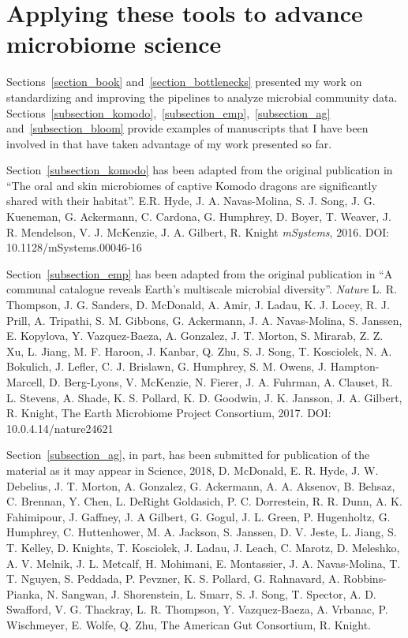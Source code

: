 \section{Applying these tools to advance microbiome science}\label{section_contributions}

Sections~\ref{section_book} and~\ref{section_bottlenecks} presented my work
on standardizing and improving the pipelines to analyze microbial community data.
Sections~\ref{subsection_komodo},~\ref{subsection_emp},~\ref{subsection_ag}
and~\ref{subsection_bloom} provide examples of manuscripts that I have been
involved in that have taken advantage of my work presented so far.

Section~\ref{subsection_komodo} has been adapted from the original publication in
``The oral and skin microbiomes of captive Komodo dragons are significantly shared
with their habitat''. E.R. Hyde, J. A. Navas-Molina, S. J. Song, J. G. Kueneman,
G. Ackermann, C. Cardona, G. Humphrey, D. Boyer, T. Weaver, J. R. Mendelson,
V. J. McKenzie, J. A. Gilbert, R. Knight \emph{mSystems}, 2016. DOI: 10.1128/mSystems.00046-16

Section~\ref{subsection_emp} has been adapted from the original publication in
``A communal catalogue reveals Earth's multiscale microbial diversity''.
\emph{Nature} L. R. Thompson, J. G. Sanders, D. McDonald, A. Amir,
J. Ladau, K. J. Locey, R. J. Prill, A. Tripathi, S. M. Gibbons, G. Ackermann,
J. A. Navas-Molina, S. Janssen, E. Kopylova, Y. Vazquez-Baeza, A. Gonzalez,
J. T. Morton, S. Mirarab, Z. Z. Xu, L. Jiang, M. F. Haroon, J. Kanbar, Q. Zhu,
S. J. Song, T. Kosciolek, N. A. Bokulich, J. Lefler, C. J. Brislawn, G. Humphrey,
S. M. Owens, J. Hampton-Marcell, D. Berg-Lyons, V. McKenzie, N. Fierer, J. A. Fuhrman,
A. Clauset, R. L. Stevens, A. Shade, K. S. Pollard, K. D. Goodwin, J. K. Jansson,
J. A. Gilbert, R. Knight, The Earth Microbiome Project Consortium, 2017. DOI: 10.0.4.14/nature24621

Section~\ref{subsection_ag}, in part, has been submitted for publication of the
material as it may appear in Science, 2018, D. McDonald, E. R. Hyde, J. W. Debelius,
J. T. Morton, A. Gonzalez, G. Ackermann, A. A. Aksenov, B. Behsaz, C. Brennan,
Y. Chen, L. DeRight Goldasich, P. C. Dorrestein, R. R. Dunn, A. K. Fahimipour,
J. Gaffney, J. A Gilbert, G. Gogul, J. L. Green, P. Hugenholtz, G. Humphrey,
C. Huttenhower, M. A. Jackson, S. Janssen, D. V. Jeste, L. Jiang, S. T. Kelley,
D. Knights, T. Kosciolek, J. Ladau, J. Leach, C. Marotz, D. Meleshko, A. V. Melnik,
J. L. Metcalf, H. Mohimani, E. Montassier, J. A. Navas-Molina, T. T. Nguyen,
S. Peddada, P. Pevzner, K. S. Pollard, G. Rahnavard, A. Robbins-Pianka,
N. Sangwan, J. Shorenstein, L. Smarr, S. J. Song, T. Spector, A. D. Swafford,
V. G. Thackray, L. R. Thompson, Y. Vazquez-Baeza, A. Vrbanac, P. Wischmeyer,
E. Wolfe, Q. Zhu, The American Gut Consortium, R. Knight.

